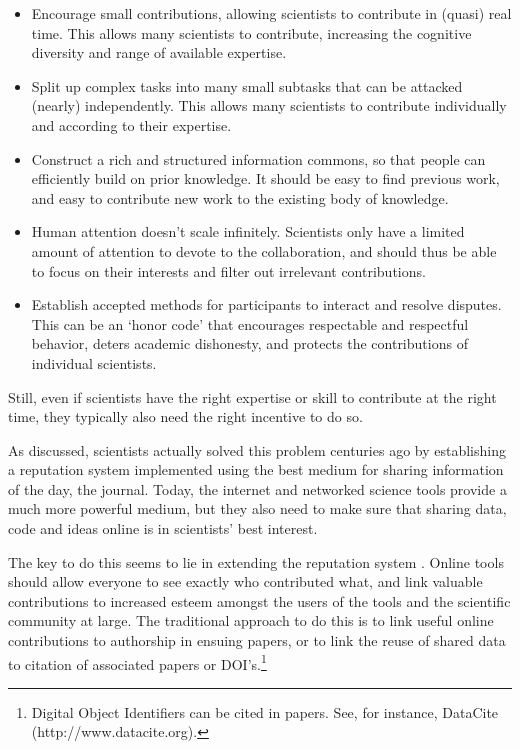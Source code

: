 \documentclass{acmproc-sp}
\begin{document}
\begin{itemize}[noitemsep]
\item Encourage small contributions, allowing scientists to contribute in (quasi) real time. This allows many scientists to contribute, increasing the cognitive diversity and range of available expertise.
\item Split up complex tasks into many small subtasks that can be attacked (nearly) independently. This allows many scientists to contribute individually and according to their expertise.
\item Construct a rich and structured information commons, so that people can efficiently build on prior knowledge. It should be easy to find previous work, and easy to contribute new work to the existing body of knowledge.
\item Human attention doesn't scale infinitely. Scientists only have a limited amount of attention to devote to the collaboration, and should thus be able to focus on their interests and filter out irrelevant contributions.
\item Establish accepted methods for participants to interact and resolve disputes. This can be an `honor code' that encourages respectable and respectful behavior, deters academic dishonesty, and protects the contributions of individual scientists.
\end{itemize}

Still, even if scientists have the right expertise or skill to contribute at the right time, they typically also need the right incentive to do so. %


As discussed, scientists actually solved this problem centuries ago by establishing a reputation system implemented using the best medium for sharing information of the day, the journal. Today, the internet and networked science tools provide a much more powerful medium, but they also need to make sure that sharing data, code and ideas online is in scientists' best interest.

The key to do this seems to lie in extending the reputation system \cite{nielsen2012reinventing}. Online tools should allow everyone to see exactly who contributed what, and link valuable contributions to increased esteem amongst the users of the tools and the scientific community at large. The traditional approach to do this is to link useful online contributions to authorship in ensuing papers, or to link the reuse of shared data to citation of associated papers or DOI's.\footnote{Digital Object Identifiers can be cited in papers. See, for instance, DataCite (http://www.datacite.org).} %
\end{document}
